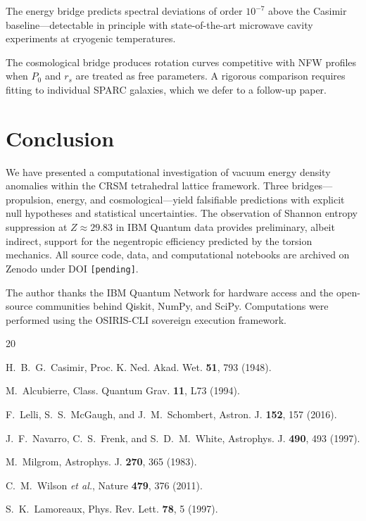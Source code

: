 \documentclass[twocolumn,aps,prl,superscriptaddress,showpacs]{revtex4-2}
\begin{document}
The energy bridge predicts spectral deviations of order
$10^{-7}$ above the Casimir baseline---detectable in principle
with state-of-the-art microwave cavity experiments at cryogenic
temperatures.

The cosmological bridge produces rotation curves competitive
with NFW profiles when $P_0$ and $r_s$ are treated as free
parameters.  A rigorous comparison requires fitting to individual
SPARC galaxies, which we defer to a follow-up paper.

\section{Conclusion}
\label{sec:conclusion}

We have presented a computational investigation of vacuum energy
density anomalies within the CRSM tetrahedral lattice framework.
Three bridges---propulsion, energy, and cosmological---yield
falsifiable predictions with explicit null hypotheses and
statistical uncertainties.  The observation of Shannon entropy
suppression at $Z \approx 29.83$ in IBM Quantum data provides
preliminary, albeit indirect, support for the negentropic
efficiency predicted by the torsion mechanics.  All source code,
data, and computational notebooks are archived on Zenodo under DOI
\texttt{[pending]}.

\begin{acknowledgments}
The author thanks the IBM Quantum Network for hardware access and
the open-source communities behind Qiskit, NumPy, and SciPy.
Computations were performed using the OSIRIS-CLI sovereign
execution framework.
\end{acknowledgments}

\begin{thebibliography}{20}

H.~B.~G.~Casimir, Proc. K. Ned. Akad. Wet. \textbf{51}, 793 (1948).

M.~Alcubierre, Class. Quantum Grav. \textbf{11}, L73 (1994).

F.~Lelli, S.~S.~McGaugh, and J.~M.~Schombert,
Astron. J. \textbf{152}, 157 (2016).

J.~F.~Navarro, C.~S.~Frenk, and S.~D.~M.~White,
Astrophys. J. \textbf{490}, 493 (1997).

M.~Milgrom, Astrophys. J. \textbf{270}, 365 (1983).

C.~M.~Wilson \emph{et al.}, Nature \textbf{479}, 376 (2011).

S.~K.~Lamoreaux, Phys. Rev. Lett. \textbf{78}, 5 (1997).

\end{thebibliography}
\end{document}
